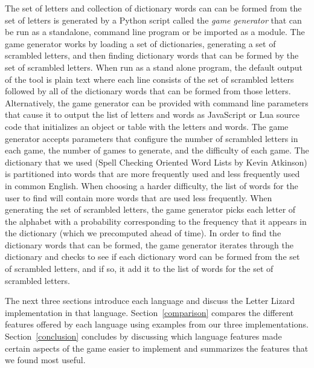 The set of letters and collection of dictionary words can can be formed from the set of letters
is generated by a Python script called the \emph{game generator} that can be run as a standalone,
command line program or be imported as a module. The game generator works by loading a set
of dictionaries, generating a set of scrambled letters, and then finding dictionary words that can
be formed by the set of scrambled letters. When run as a stand alone program, the default output of the
tool is plain text where each line consists of the set of scrambled letters followed by all of the 
dictionary words that can be formed from those letters. Alternatively, the game generator can be provided
with command line parameters that cause it to output the list of letters and words as JavaScript or Lua 
source code that initializes an object or table with the letters and words.
The game generator accepts parameters that configure the
number of scrambled letters in each game, the number of games to generate, and the difficulty
of each game. The dictionary that we used (Spell Checking Oriented Word Lists by Kevin
Atkinson) is partitioned into words that are more frequently used and less frequently used in
common English. When choosing a harder difficulty, the list of words for the user to find will
contain more words that are used less frequently.
When generating the set of scrambled letters, the game generator picks each letter of the alphabet with a
probability corresponding to the frequency that it appears in the dictionary (which we
precomputed ahead of time). In order to find the dictionary words that can be formed, the game generator
iterates through the dictionary and checks to see if each dictionary word can be formed from the set of 
scrambled letters, and if so, it add it to the list of words for the set of scrambled letters.

The next three sections introduce each language and discuss the Letter Lizard implementation in
that language. Section~\ref{comparison} compares the different features offered by each language using
examples from our three implementations. Section~\ref{conclusion} concludes by discussing which
language features made certain aspects of the game easier to implement and summarizes the features
that we found most useful.